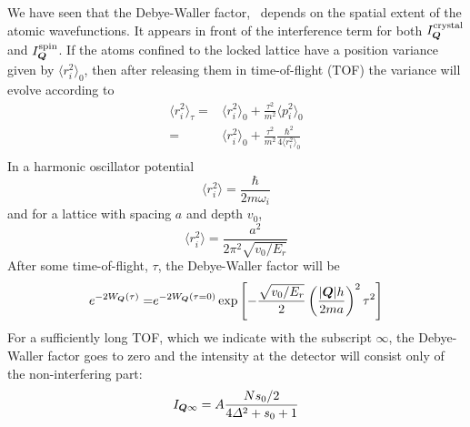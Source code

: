 We have seen that the Debye-Waller factor,  \debyew\ depends on the spatial
extent of the atomic wavefunctions.   It appears in front of the interference
term for both $I_{\bm{Q}}^{\mathrm{crystal}}$ and $I_{\bm{Q}}^{\mathrm{spin}}$.
If the atoms confined to the locked lattice have a position variance given by
$\langle r_{i}^{2} \rangle_{0}$,  then after releasing them in time-of-flight
(TOF) the variance will evolve according to  
\begin{equation}
\begin{split} 
  \langle r_{i}^{2} \rangle_{\tau} = &
   \langle r_{i}^{2} \rangle_{0} + 
  \frac{\tau^{2}}{m^{2}} \langle p_{i}^{2} \rangle_{0} \\
  = &  \langle r_{i}^{2} \rangle_{0} + 
  \frac{\tau^{2}}{m^{2}} \frac{\hbar^{2}}{4  \langle r_{i}^{2} \rangle_{0} } \\
\end{split}
\end{equation} 
In a harmonic oscillator potential 
\begin{equation}
    \langle r_{i}^{2} \rangle = \frac{\hbar}{2 m \omega_{i}}
\end{equation}
and for a lattice with spacing $a$ and depth $v_{0}$,  
\begin{equation}
    \langle r_{i}^{2} \rangle = \frac{a^{2}}{ 2 \pi^{2} \sqrt{v_{0}/E_{r}} }
\end{equation}
After some time-of-flight, $\tau$, the Debye-Waller factor will be 
\begin{equation}
\begin{split}
    e^{-2W_{\bm{Q}}(\tau)} =& e^{-2W_{\bm{Q}}(\tau=0) } \exp\left[
-\frac{\sqrt{v_{0}/E_{r}}}{2} \left( \frac{ |\bm{Q}| h }{2 m a  } \right)^{2}
\tau^{2}   \right] \\
\label{eq:bragg-tof-decay}
\end{split}
\end{equation}
For a sufficiently long TOF, which we indicate with the subscript $\infty$, the
Debye-Waller factor goes to zero and the intensity at the detector will consist
only of the non-interfering part:
\begin{equation}
  I_{\bm{Q}\infty}  = A \frac{ N s_{0} / 2}{ 4 \Delta^{2} + s_{0}+1 } 
\end{equation}

